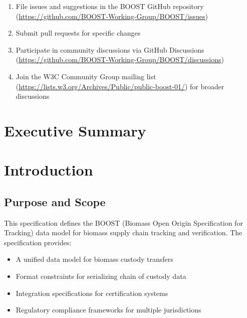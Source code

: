 \documentclass{article}
\begin{document}
\begin{enumerate}
    \item File issues and suggestions in the BOOST GitHub repository (\url{https://github.com/BOOST-Working-Group/BOOST/issues})
    \item Submit pull requests for specific changes
    \item Participate in community discussions via GitHub Discussions (\url{https://github.com/BOOST-Working-Group/BOOST/discussions})
    \item Join the W3C Community Group mailing list (\url{https://lists.w3.org/Archives/Public/public-boost-01/}) for broader discussions
\end{enumerate}

\newpage
\tableofcontents

\newpage
\listoftables

\newpage
\listoffigures


\newpage
{}


\section{Executive Summary}
\label{sec:executive-summary}


\section{Introduction}
\label{sec:introduction}


\subsection{Purpose and Scope}
\label{sec:purpose-scope}

This specification defines the BOOST (Biomass Open Origin Specification for Tracking) data model for biomass supply chain tracking and verification. The specification provides:

\begin{itemize}
    \item A unified data model for biomass custody transfers
    \item Format constraints for serializing chain of custody data
    \item Integration specifications for certification systems
    \item Regulatory compliance frameworks for multiple jurisdictions
\end{itemize}
\end{document}
